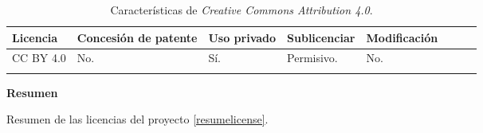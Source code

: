 \begin{longtable}[]{@{}llllllll@{}} 
\toprule 
\begin{minipage}[b]{0.15\columnwidth}\raggedright\strut
Licencia\strut
\end{minipage} & \begin{minipage}[b]{0.18\columnwidth}\raggedright\strut
Concesión de patente\strut
\end{minipage} & \begin{minipage}[b]{0.17\columnwidth}\raggedright\strut
Uso privado\strut
\end{minipage} & \begin{minipage}[b]{0.15\columnwidth}\raggedright\strut
Sublicenciar\strut
\end{minipage} & \begin{minipage}[b]{0.17\columnwidth}\raggedright\strut
Modificación\strut
\end{minipage}\tabularnewline
\midrule
\endhead
\begin{minipage}[t]{0.15\columnwidth}\raggedright\strut
CC BY 4.0\strut
\end{minipage} & \begin{minipage}[t]{0.18\columnwidth}\raggedright\strut
No.\strut
\end{minipage} & \begin{minipage}[t]{0.17\columnwidth}\raggedright\strut
Sí.\strut
\end{minipage} & \begin{minipage}[t]{0.15\columnwidth}\raggedright\strut
Permisivo.\strut
\end{minipage} & \begin{minipage}[t]{0.17\columnwidth}\raggedright\strut
No.\strut
\end{minipage}\tabularnewline
\bottomrule
\caption{Características de \textit{Creative Commons Attribution 4.0}.}
\label{tab:ccaresumetable1}
\end{longtable}

\textbf{Resumen}

Resumen de las licencias del proyecto \ref{resumelicense}.

